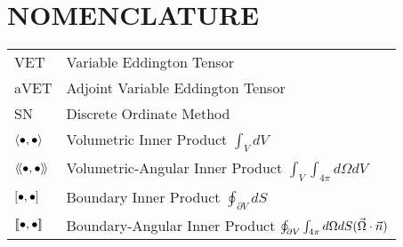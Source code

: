 
\chapter*{NOMENCLATURE}


\hspace*{-1.25in}
\vspace{12pt}
\begin{spacing}{1.0}
	\begin{longtable}[htbp]{@{}p{} p{}@{}}
		VET 		& Variable Eddington Tensor\\	[2ex]
		aVET 		& Adjoint Variable Eddington Tensor\\	[2ex]
		SN 			& Discrete Ordinate Method\\	[2ex]
		$\left\langle \bullet , \bullet \right\rangle$ 				& Volumetric Inner Product $\int_V dV$ \\	[2ex]
		$\left\langle \! \left\langle \bullet , \bullet \right\rangle \! \right\rangle$ 			& Volumetric-Angular Inner Product $\int_V \int_{4 \pi} d\Omega dV$ \\	[2ex]
		$\left[ \bullet , \bullet \right]$ 			& Boundary Inner Product $\oint_{\partial V} dS$ \\	[2ex]
		$\left[ \! \left[ \bullet , \bullet \right] \! \right]$ 		& Boundary-Angular Inner Product $\oint_{\partial V} \int_{4 \pi} d\Omega dS (\vec{\Omega} \cdot \vec{n})$ \\	[2ex]
	\end{longtable}
\end{spacing}

\pagebreak{}
